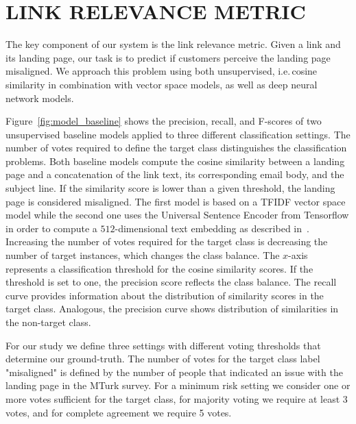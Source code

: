 \documentclass{sigchi}
\begin{document}
\section{LINK RELEVANCE METRIC}
The key component of our system is the link relevance metric. Given a link and its landing page, our task is to predict if customers perceive the landing page misaligned. 
We approach this problem using both unsupervised, i.e.\,cosine similarity in combination with vector space models, as well as deep neural network models. 

Figure~\ref{fig:model_baseline} shows the precision, recall, and F-scores of two unsupervised baseline models applied to three different classification settings. The number of votes required to define the target class distinguishes the classification problems. Both baseline models compute the cosine similarity between a landing page and a concatenation of the link text, its corresponding email body, and the subject line. If the similarity score is lower than a given threshold, the landing page is considered misaligned. The first model is based on a TFIDF vector space model while the second one uses the Universal Sentence Encoder from Tensorflow in order to compute a $512$-dimensional text embedding as described in~\cite{cer_2018}. Increasing the number of votes required for the target class is decreasing the number of target instances, which changes the class balance. The $x$-axis represents a classification threshold for the cosine similarity scores. If the threshold is set to one, the precision score reflects the class balance. The recall curve provides information about the distribution of similarity scores in the target class. Analogous, the precision curve shows distribution of similarities in the non-target class.

For our study we define three settings with different voting thresholds that determine our ground-truth. The number of votes for the target class label "misaligned" is defined by the number of people that indicated an issue with the landing page in the MTurk survey. For a minimum risk setting we consider one or more votes sufficient for the target class, for majority voting we require at least 3 votes, and for complete agreement we require 5 votes.
\end{document}
